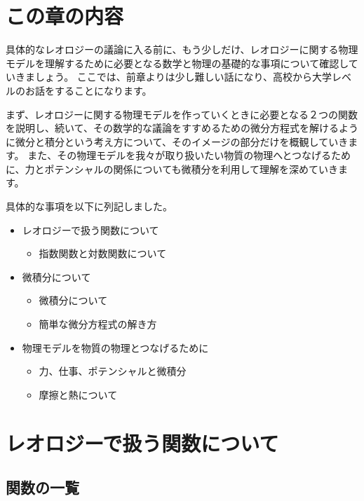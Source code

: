 \documentclass[uplatex,dvipdfmx,a4paper,11pt]{jsarticle}
\begin{document}
\section*{この章の内容}

具体的なレオロジーの議論に入る前に、もう少しだけ、レオロジーに関する物理モデルを理解するために必要となる数学と物理の基礎的な事項について確認していきましょう。
ここでは、前章よりは少し難しい話になり、高校から大学レベルのお話をすることになります。

まず、レオロジーに関する物理モデルを作っていくときに必要となる２つの関数を説明し、続いて、その数学的な議論をすすめるための微分方程式を解けるように微分と積分という考え方について、そのイメージの部分だけを概観していきます。
また、その物理モデルを我々が取り扱いたい物質の物理へとつなげるために、力とポテンシャルの関係についても微積分を利用して理解を深めていきます。

具体的な事項を以下に列記しました。
\begin{boxnote}
	\large
	\begin{itemize}
		\item レオロジーで扱う関数について
		\begin{itemize}
			\item 指数関数と対数関数について
		\end{itemize}
		\item 微積分について
		\begin{itemize}
			\item 微積分について
			\item 簡単な微分方程式の解き方
		\end{itemize} 
		\item 物理モデルを物質の物理とつなげるために
		\begin{itemize}
			\item 力、仕事、ポテンシャルと微積分
			\item 摩擦と熱について
		\end{itemize} 
	\end{itemize}
\end{boxnote}

\section{レオロジーで扱う関数について}

\subsection{関数の一覧}
\end{document}

